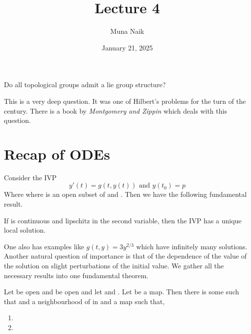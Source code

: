 \documentclass{article}
\title{Lecture 4}
\date{January 21, 2025}
\author{Muna Naik}
\begin{document}
\maketitle

\begin{question*}
    Do all topological groups admit a lie group structure?
\end{question*}

This is a very deep question. It was one of Hilbert's problems for the turn of the century. 
There is a book by \textit{Montgomery and Zippin} which deals with this question.

\section{Recap of ODEs}

Consider the IVP 
$$y'(t)=g(t,y(t))\text{ and }y(t_0)=p$$
Where  where \mm{\Omega} is an open subset of  and . 
Then we have the following fundamental result.

\begin{theorem}
    If  is continuous and lipschitz in the second variable, then the IVP has a unique local solution.
\end{theorem}

One also has examples like $g(t,y) = 3y^{2/3}$ which have infinitely many solutions. Another natural question of importance is that of the dependence 
of the value of the solution on slight perturbations of the initial value. We gather all the necessary results into one fundamental theorem.

\begin{theorem}
    Let  be open and  be open and let 
    and . Let  be a  map. Then there is some  such that  and a neighbourhood  of  in  and 
    a map  such that,
    \begin{enumerate}
        \item {}
        \item {}
    \end{enumerate}
\end{theorem}

\newpage
\end{document}
